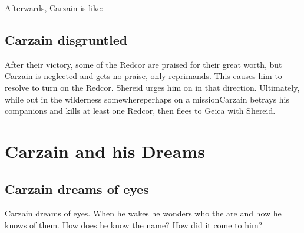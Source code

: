 Afterwards, Carzain is like: 







\subsection{Carzain disgruntled}
After their victory, some of the Redcor are praised for their great worth, but Carzain is neglected and gets no praise, only reprimands. This causes him to resolve to turn on the Redcor. Shereid urges him on in that direction. Ultimately, while out in the wilderness somewhere\dash perhaps on a mission\dash Carzain betrays his \Redcean{} companions and kills at least one Redcor, then flees to Geica with Shereid. 


















\section{Carzain and his Dreams}









\subsection{Carzain dreams of \ophidian{} eyes}
Carzain dreams of \ophidian{} eyes. When he wakes he wonders who the \ophidians{} are and how he knows of them. How does he know the name? How did it come to him?

